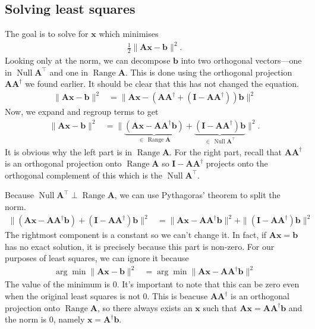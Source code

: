 \documentclass[12pt,a4paper]{article} %
\DeclareMathOperator{\Range}{Range}
\DeclareMathOperator{\Null}{Null}
\begin{document}
\newpage
\subsection{Solving least squares}
The goal is to solve for $\bm x$ which minimises
\begin{align*}
    \frac{1}{2}\| \mathbf A \bm x - \bm b \| ^2.
\end{align*}
Looking only at the norm, we can decompose $\bm b$ into two orthogonal vectors---one in $\Null \mathbf A^\top$ and one 
in $\Range \mathbf A$. This is done using the orthogonal projection $\mathbf A\mathbf A^\dagger$ we found earlier. 
It should be clear that this has not changed the equation. 
\begin{align*}
    \| \mathbf A \bm x - \bm b \| ^2 &= \| \mathbf A \bm x - (\mathbf A \mathbf A^\dagger + (\mathbf I - \mathbf A\mathbf A^\dagger))\bm b \|^2
\end{align*}
Now, we expand and regroup terms to get 
\begin{align*}
    \| \mathbf A \bm x - \bm b \| ^2 &= \| \underbrace{(\mathbf A \bm x - \mathbf A \mathbf A^\dagger \bm b)}_{\in \,\Range \mathbf A} + \underbrace{(\mathbf I - \mathbf A\mathbf A^\dagger)\bm b}_{\in \, \Null \mathbf A^\top} \|^2.
\end{align*}
It is obvious why the left part is in $\Range \mathbf A$. For the right part, recall that $\mathbf A \mathbf A^\dagger$ is an orthogonal projection onto $\Range \mathbf A$
so 
$\mathbf I - \mathbf A \mathbf A^\dagger$ projects onto the orthogonal complement of this which is the $\Null \mathbf A^\top$.

Because $\Null \mathbf A^\top \perp \Range \mathbf A$, we can use Pythagoras' theorem to split the norm.
\begin{align*}
    \| {(\mathbf A \bm x - \mathbf A \mathbf A^\dagger \bm b)} + {(\mathbf I - \mathbf A\mathbf A^\dagger)\bm b} \|^2
    &= \| {\mathbf A \bm x - \mathbf A \mathbf A^\dagger \bm b} \| ^2 + \| {(\mathbf I - \mathbf A\mathbf A^\dagger)\bm b}  \| ^2
\end{align*}
The rightmost component is a constant so we can't change it. 
In fact, if $\mathbf A \bm x = \bm b$ has no exact solution, 
it is precisely because this part is non-zero. For our purposes of least squares, we can ignore it because 
\begin{align*}
    \arg\min \| \mathbf A \bm x - \bm b \| ^2 &= \arg \min \| {\mathbf A \bm x - \mathbf A \mathbf A^\dagger \bm b} \| ^2
\end{align*}
The value of the minimum is 0. 
It's important to note that this can be zero even when 
the original least squares is not 0. This is beacuse $\mathbf A \mathbf A^\dagger$ is an orthogonal projection onto 
$\Range \mathbf A$, so there always exists  an $\bm x$ such that $\mathbf A \bm x = \mathbf A \mathbf A^\dagger \bm b$ and the 
norm is 0, namely $\bm x = \mathbf A^\dagger \bm b$.
\end{document}
